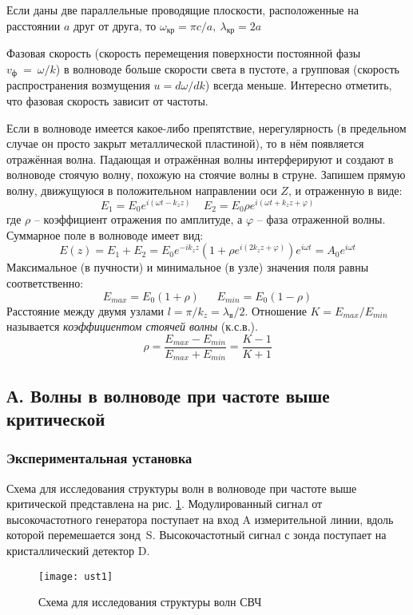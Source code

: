 \documentclass{lab}
\begin{document}
Если даны две параллельные проводящие плоскости, расположенные на расстоянии $a$ друг от друга,
то $\omega_{кр} = \pi c/a, ~ \lambda_{кр} = 2a$

Фазовая скорость (скорость перемещения поверхности постоянной фазы $v_ф~=~\omega/k$) в волноводе больше скорости света в пустоте, а групповая (скорость распространения возмущения 
$u = d\omega/dk$) всегда меньше. Интересно отметить, что фазовая скорость зависит от частоты.

Если в волноводе имеется какое-либо препятствие, нерегулярность (в предельном случае он просто
закрыт металлической пластиной), то в нём появляется отражённая волна. Падающая
и отражённая волны интерферируют и создают в волноводе стоячую волну, похожую на стоячие
волны в струне. Запишем прямую волну, движущуюся в положительном
направлении оси $Z$, и отраженную в виде:
$$ E_1 = E_0 e^{i(\omega t - k_zz)} ~~~~~ E_2 = E_0 \rho e^{i(\omega t + k_zz + \varphi)} $$
где $\rho$ -- коэффициент отражения по амплитуде, а $\varphi$ -- фаза отраженной волны.
Суммарное поле в волноводе имеет вид:
$$ E(z) = E_1 + E_2 = E_0e^{-ik_zz}(1+\rho e^{i(2k_zz+\varphi)})e^{i\omega t} = A_0e^{i\omega t} $$
Максимальное (в пучности) и минимальное (в узле) значения поля равны соответственно:
$$ E_{max} = E_0(1+\rho)~~~~~~~E_{min} = E_0(1-\rho) $$
Расстояние между двумя узлами $l = \pi/k_z = \lambda_в/2$. Отношение $K = E_{max}/E_{min}$
называется {\it коэффициентом стоячей волны} (к.с.в.).
$$ \rho = \dfrac{E_{max} - E_{min}}{E_{max} + E_{min}} = \dfrac{K - 1}{K + 1} $$

\subsection*{А. Волны в волноводе при частоте выше критической}
\subsubsection*{Экспериментальная установка}

Схема для исследования структуры волн в волноводе при частоте выше критической представлена
на рис. \ref{ust1}. Модулированный сигнал от высокочастотного генератора поступает на вход
A измерительной линии, вдоль которой перемешается зонд~S. Высокочастотный сигнал с зонда поступает
на кристаллический детектор D.

\begin{figure}[H]
	\centering
	\texttt{[image: ust1]}
	\caption{\footnotesize
		Схема для исследования структуры волн СВЧ
	}
	\label{ust1}
\end{figure}
\end{document}
